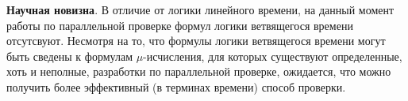 \documentclass[a4paper,notitlepage,14pt]{article}
\begin{document}
\textbf{Научная новизна}. В отличие от логики линейного времени, на данный момент работы
по параллельной проверке формул логики ветвящегося времени отсутсвуют. Несмотря на то, что
формулы логики ветвящегося времени могут быть сведены к формулам $\mu$-исчисления, для
которых существуют определенные, хоть и неполные, разработки по параллельной проверке,
ожидается, что можно получить более эффективный (в терминах времени) способ проверки.



\end{document}
